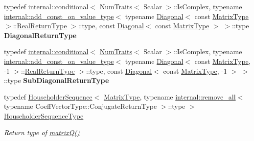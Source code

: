 \begin{DoxyCompactItemize}
typedef \hyperlink{struct_eigen_1_1internal_1_1conditional}{internal\+::conditional}$<$ \hyperlink{group___core___module_struct_eigen_1_1_num_traits}{Num\+Traits}$<$ Scalar $>$\+::Is\+Complex, typename \hyperlink{struct_eigen_1_1internal_1_1add__const__on__value__type}{internal\+::add\+\_\+const\+\_\+on\+\_\+value\+\_\+type}$<$ typename \hyperlink{group___core___module_class_eigen_1_1_diagonal}{Diagonal}$<$ const \hyperlink{group___eigenvalues___module_add0f4b2216d0ea8ee0f7d8525deaf0a9}{Matrix\+Type} $>$\+::\hyperlink{class_eigen_1_1internal_1_1_tensor_lazy_evaluator_writable}{Real\+Return\+Type} $>$\+::type, const \hyperlink{group___core___module_class_eigen_1_1_diagonal}{Diagonal}$<$ const \hyperlink{group___eigenvalues___module_add0f4b2216d0ea8ee0f7d8525deaf0a9}{Matrix\+Type} $>$ $>$\+::type {\bfseries Diagonal\+Return\+Type}
\item 
\mbox{\label{group___eigenvalues___module_a596ee75896d4302b84b1467d5c74e871}} 
typedef \hyperlink{struct_eigen_1_1internal_1_1conditional}{internal\+::conditional}$<$ \hyperlink{group___core___module_struct_eigen_1_1_num_traits}{Num\+Traits}$<$ Scalar $>$\+::Is\+Complex, typename \hyperlink{struct_eigen_1_1internal_1_1add__const__on__value__type}{internal\+::add\+\_\+const\+\_\+on\+\_\+value\+\_\+type}$<$ typename \hyperlink{group___core___module_class_eigen_1_1_diagonal}{Diagonal}$<$ const \hyperlink{group___eigenvalues___module_add0f4b2216d0ea8ee0f7d8525deaf0a9}{Matrix\+Type}, -\/1 $>$\+::\hyperlink{class_eigen_1_1internal_1_1_tensor_lazy_evaluator_writable}{Real\+Return\+Type} $>$\+::type, const \hyperlink{group___core___module_class_eigen_1_1_diagonal}{Diagonal}$<$ const \hyperlink{group___eigenvalues___module_add0f4b2216d0ea8ee0f7d8525deaf0a9}{Matrix\+Type}, -\/1 $>$ $>$\+::type {\bfseries Sub\+Diagonal\+Return\+Type}
\item 
\mbox{\label{group___eigenvalues___module_af322315c8bea9990152c9d09bfa2a69f}} 
typedef \hyperlink{group___householder___module_class_eigen_1_1_householder_sequence}{Householder\+Sequence}$<$ \hyperlink{group___eigenvalues___module_add0f4b2216d0ea8ee0f7d8525deaf0a9}{Matrix\+Type}, typename \hyperlink{struct_eigen_1_1internal_1_1remove__all}{internal\+::remove\+\_\+all}$<$ typename Coeff\+Vector\+Type\+::\+Conjugate\+Return\+Type $>$\+::type $>$ \hyperlink{group___eigenvalues___module_af322315c8bea9990152c9d09bfa2a69f}{Householder\+Sequence\+Type}
\begin{DoxyCompactList}\small\item\em Return type of \hyperlink{group___eigenvalues___module_a000f7392eda930576ffd2af1fae54af2}{matrix\+Q()} \end{DoxyCompactList}\item 

\end{DoxyCompactItemize}
